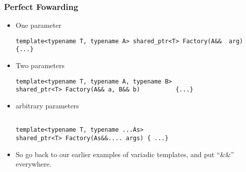 \begin{frame}[fragile,t]
\frametitle{Perfect Fowarding}
\begin{itemize}[<+->]
\item One parameter
{\scriptsize\begin{verbatim}
template<typename T, typename A> shared_ptr<T> Factory(A&&  arg) {...}
\end{verbatim}
}
\item Two parameters
{\scriptsize\begin{verbatim}
template<typename T, typename A, typename B>
shared_ptr<T> Factory(A&& a, B&& b)          {...}

\end{verbatim}
}
\item arbitrary parameters
{\scriptsize\begin{verbatim}

template<typename T, typename ...As>
shared_ptr<T> Factory(As&&.... args) { ...}
\end{verbatim}
}

\vskip 12pt
\item So go back to our earlier examples of variadic templates, and
  put ``\&\&'' everywhere.
\end{itemize}
\end{frame}



